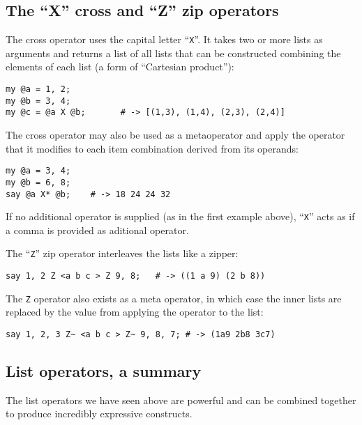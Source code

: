 \subsection{The ``X'' cross and ``Z'' zip operators}

The cross operator uses the capital letter ``\verb"X"''.
It takes two or more lists as arguments and returns a list 
of all lists that can be constructed combining the elements 
of each list (a form of ``Cartesian product''):

\begin{verbatim}
my @a = 1, 2;
my @b = 3, 4;
my @c = @a X @b;       # -> [(1,3), (1,4), (2,3), (2,4)]
\end{verbatim}

The cross operator may also be used as a metaoperator and 
apply the operator that it modifies to each item combination 
derived from its operands:

\begin{verbatim}
my @a = 3, 4;
my @b = 6, 8;
say @a X* @b;    # -> 18 24 24 32
\end{verbatim}

If no additional operator is supplied (as in the first 
example above), ``\verb"X"'' acts as if a comma is 
provided as aditional operator. 

The ``\verb"Z"'' zip operator interleaves the lists 
like a zipper:

\begin{verbatim}
say 1, 2 Z <a b c > Z 9, 8;   # -> ((1 a 9) (2 b 8))
\end{verbatim}

The \verb'Z' operator also exists as a meta operator, in 
which case the inner lists are replaced by the value 
from applying the operator to the list:

\begin{verbatim}
say 1, 2, 3 Z~ <a b c > Z~ 9, 8, 7; # -> (1a9 2b8 3c7)
\end{verbatim}

\subsection{List operators, a summary}

The list operators we have seen above are powerful 
and can be combined together to produce incredibly 
expressive constructs.

